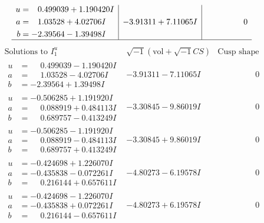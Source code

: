 \documentclass[1p]{elsarticle_modified}
\theoremstyle{definition}
\newcommand{\I}{\sqrt{-1}}
\begin{document}
$$\begin{array}{c|c|c}
\begin{aligned}
u &= \phantom{-}0.499039 + 1.190420 I \\
a &= \phantom{-}1.03528 + 4.02706 I \\
b &= -2.39564 - 1.39498 I\end{aligned}
 & -3.91311 + 7.11065 I & \phantom{-0.000000 } 0\\
 \hline 
 \end{array}$$\newpage$$\begin{array}{c|c|c}  
\text{Solutions to }I^u_{1}& \I (\text{vol} + \sqrt{-1}CS) & \text{Cusp shape}\\
 \hline 
\begin{aligned}
u &= \phantom{-}0.499039 - 1.190420 I \\
a &= \phantom{-}1.03528 - 4.02706 I \\
b &= -2.39564 + 1.39498 I\end{aligned}
 & -3.91311 - 7.11065 I & \phantom{-0.000000 } 0 \\ \hline\begin{aligned}
u &= -0.506285 + 1.191920 I \\
a &= \phantom{-}0.088919 + 0.484113 I \\
b &= \phantom{-}0.689757 - 0.413249 I\end{aligned}
 & -3.30845 - 9.86019 I & \phantom{-0.000000 } 0 \\ \hline\begin{aligned}
u &= -0.506285 - 1.191920 I \\
a &= \phantom{-}0.088919 - 0.484113 I \\
b &= \phantom{-}0.689757 + 0.413249 I\end{aligned}
 & -3.30845 + 9.86019 I & \phantom{-0.000000 } 0 \\ \hline\begin{aligned}
u &= -0.424698 + 1.226070 I \\
a &= -0.435838 - 0.072261 I \\
b &= \phantom{-}0.216144 + 0.657611 I\end{aligned}
 & -4.80273 - 6.19578 I & \phantom{-0.000000 } 0 \\ \hline\begin{aligned}
u &= -0.424698 - 1.226070 I \\
a &= -0.435838 + 0.072261 I \\
b &= \phantom{-}0.216144 - 0.657611 I\end{aligned}
 & -4.80273 + 6.19578 I & \phantom{-0.000000 } 0 \\ \hline\begin{aligned}

\end{aligned}
\end{array}$$
\end{document}
